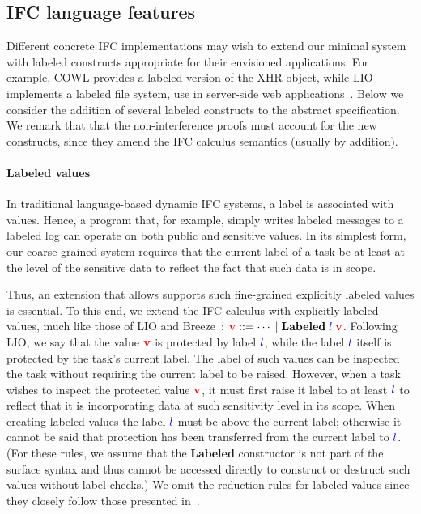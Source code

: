 \documentclass{sigplanconf}
\begin{document}
\subsection{IFC language features}
\label{sec:extensions:labeled}

Different concrete IFC implementations may wish to extend our minimal
system with labeled constructs appropriate for their envisioned
applications.
%
For example, COWL provides a labeled version of the XHR object, while
LIO implements a labeled file system, use in server-side web
applications~\cite{hails}.
%
Below we
consider the addition of several labeled constructs to the abstract specification.
%
We remark that that the non-interference proofs must account for the
new constructs, since they amend the IFC calculus semantics (usually
by addition).

\paragraph{Labeled values}
In traditional language-based dynamic IFC systems, a label is
associated with values.
%
Hence, a program that, for example, simply writes labeled messages to
a labeled log can operate on both public and sensitive values.
%
In its simplest form, our coarse grained system requires that the
current label of a task be at least at the level of the sensitive data
to reflect the fact that such data is in scope.
 
Thus, an extension that allows supports such fine-grained explicitly
labeled values is essential.
%
To this end, we extend the IFC calculus with explicitly labeled
values, much like those of LIO and
Breeze~\cite{lio, Hritcu:2013:YIB:2497621.2498098}: \ensuremath{\tar{v}\Coloneqq\cdots\;|\;\textbf{Labeled}\;\ifc{l}\;\tar{v}}.
%
Following LIO, we say that the value \ensuremath{\tar{v}} is protected by label \ensuremath{\ifc{l}},
while the label \ensuremath{\ifc{l}} itself is protected by the task's current label.
%
%
The label of such values can be inspected the task without
requiring the current label to be raised.
%
However, when a task wishes to inspect the protected value \ensuremath{\tar{v}}, it
must first raise it label to at least \ensuremath{\ifc{l}} to reflect that it is
incorporating data at such sensitivity level in its scope.
%
When creating labeled values the label \ensuremath{\ifc{l}} must be above
the current label; otherwise it cannot be said that protection has
been transferred from the current label to \ensuremath{\ifc{l}}.
%
(For these rules, we assume that the \ensuremath{\textbf{Labeled}} constructor is not part of
the surface syntax and thus cannot be accessed directly to construct
or destruct such values without label checks.)
% 
We omit the reduction rules for labeled values since they closely
follow those presented in~\cite{lio}.
\end{document}
